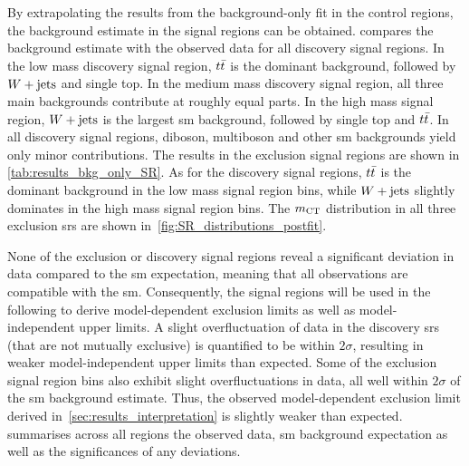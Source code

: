 By extrapolating the results from the background-only fit in the control regions, the background estimate in the signal regions can be obtained.  compares the background estimate with the observed data for all discovery signal regions. In the low mass discovery signal region, $t\bar{t}$ is the dominant background, followed by $W+\mathrm{jets}$ and single top. In the medium mass discovery signal region, all three main backgrounds contribute at roughly equal parts. In the high mass signal region, $W+\mathrm{jets}$ is the largest \gls{sm} background, followed by single top and $t\bar{t}$. In all discovery signal regions, diboson, multiboson and other \gls{sm} backgrounds yield only minor contributions. The results in the exclusion signal regions are shown in \cref{tab:results_bkg_only_SR}. As for the discovery signal regions, $t\bar{t}$ is the dominant background in the low mass signal region bins, while $W+\mathrm{jets}$ slightly dominates in the high mass signal region bins. The $m_{\textrm{CT}}$ distribution in all three exclusion \glspl{sr} are shown in~\cref{fig:SR_distributions_postfit}.

None of the exclusion or discovery signal regions reveal a significant deviation in data compared to the \gls{sm} expectation, meaning that all observations are compatible with the \gls{sm}. Consequently, the signal regions will be used in the following to derive model-dependent exclusion limits as well as model-independent upper limits. A slight overfluctuation of data in the discovery \glspl{sr} (that are not mutually exclusive) is quantified to be within $2\sigma$, resulting in weaker model-independent upper limits than expected. Some of the exclusion signal region bins also exhibit slight overfluctuations in data, all well within $2\sigma$ of the \gls{sm} background estimate. Thus, the observed model-dependent exclusion limit derived in~\cref{sec:results_interpretation} is slightly weaker than expected.  summarises across all regions the observed data, \gls{sm} background expectation as well as the significances of any deviations.





